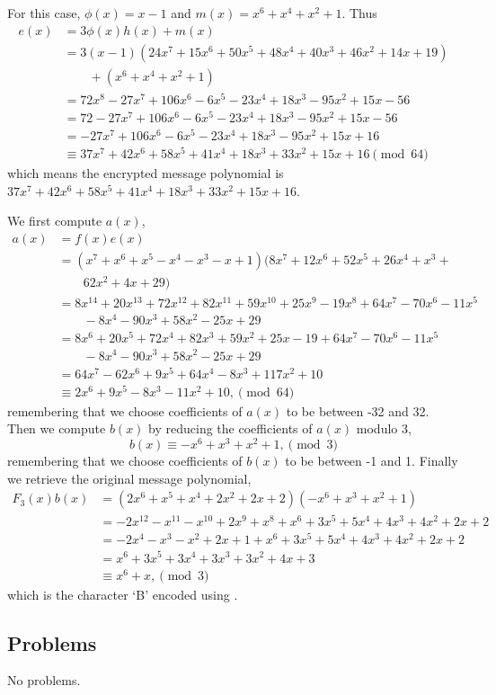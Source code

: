 \begin{questions}
    \item For this case, $\phi(x) = x - 1$ and $m(x) = x^6 + x^4 + x^2 + 1$. Thus
    \begin{align*}
        e(x) &= 3\phi(x)h(x) + m(x) \\
        &= 3(x-1)(24x^7 + 15x^6 + 50x^5 + 48x^4 + 40x^3 + 46x^2 + 14x + 19)\\
        &\quad\quad + (x^6 + x^4 + x^2 + 1)\\
        &= 72x^8 - 27x^7 + 106x^6 - 6x^5 - 23x^4 + 18x^3 - 95x^2 + 15x - 56\\
        &= 72 - 27x^7 + 106x^6 - 6x^5 - 23x^4 + 18x^3 - 95x^2 + 15x - 56\\
        &= -27x^7 + 106x^6 - 6x^5 - 23x^4 + 18x^3 - 95x^2 + 15x + 16\\
        &\equiv 37x^7 + 42x^6 + 58x^5 + 41x^4 + 18x^3 + 33x^2 + 15x + 16 \pmod{64}
    \end{align*}
    which means the encrypted message polynomial is $37x^7 + 42x^6 + 58x^5 + 41x^4 + 18x^3 + 33x^2 + 15x + 16$.

    \item We first compute $a(x)$,
    \begin{align*}
        a(x) &= f(x)e(x)\\
        &= (x^7 +x^6 +x^5 -x^4 -x^3 -x + 1)(8x^7 + 12x^6 + 52x^5 + 26x^4 +x^3 +\\
        &\quad\quad62x^2 + 4x + 29)\\
        &= 8x^{14} + 20x^{13} + 72x^{12} + 82x^{11} + 59x^{10} + 25x^9 - 19x^8 + 64x^7 - 70x^6 - 11x^5\\
        &\quad\quad - 8x^4 - 90x^3 + 58x^2 - 25x + 29\\
        &= 8x^6 + 20x^5 + 72x^4 + 82x^3 + 59x^2 + 25x - 19 + 64x^7 - 70x^6 - 11x^5\\
        &\quad\quad - 8x^4 - 90x^3 + 58x^2 - 25x + 29\\
        &= 64x^7 - 62x^6 + 9x^5 + 64x^4 - 8x^3 + 117x^2 + 10\\
        &\equiv 2x^6 + 9x^5 - 8x^3 - 11x^2 + 10, \pmod{64}
    \end{align*}
    remembering that we choose coefficients of $a(x)$ to be between -32 and 32. Then we compute $b(x)$ by reducing the coefficients of $a(x)$ modulo 3,
    \[
        b(x) \equiv -x^6 + x^3 + x^2 + 1, \pmod{3}
    \]
    remembering that we choose coefficients of $b(x)$ to be between -1 and 1. Finally we retrieve the original message polynomial,
    \begin{align*}
        F_3(x)b(x) &= (2x^6 +x^5 +x^4 + 2x^2 + 2x + 2)(-x^6 + x^3 + x^2 + 1)\\
        &= -2x^{12} - x^{11} - x^{10} + 2x^9 + x^8 + x^6 + 3x^5 + 5x^4 + 4x^3 + 4x^2 + 2x + 2\\
        &= -2x^4 - x^3 - x^2 + 2x + 1 + x^6 + 3x^5 + 5x^4 + 4x^3 + 4x^2 + 2x + 2\\
        &= x^6 + 3x^5 + 3x^4 + 3x^3 + 3x^2 + 4x + 3\\
        &\equiv x^6 + x, \pmod{3}
    \end{align*}
    which is the character `B' encoded using .
\end{questions}

\subsection*{Problems}
No problems.
